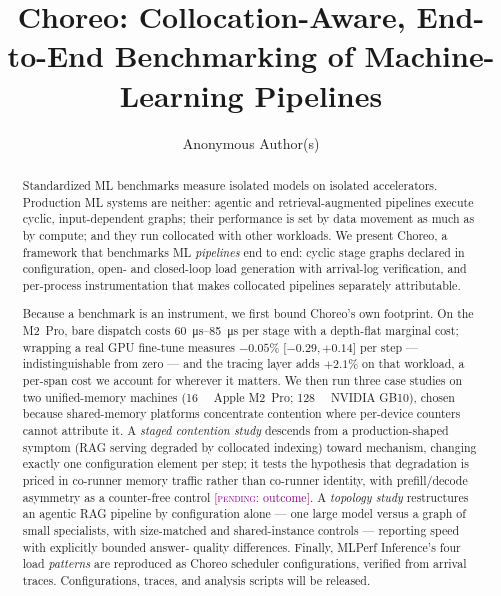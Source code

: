 \documentclass[sigconf,anonymous,review]{acmart}
\newcommand{\sysname}{Choreo}
\newcommand{\pending}[1]{\textcolor{purple}{[\textsc{pending}: #1]}}
\begin{document}
\title{\sysname: Collocation-Aware, End-to-End Benchmarking of
Machine-Learning Pipelines}

\author{Anonymous Author(s)}

\begin{abstract}
Standardized ML benchmarks measure isolated models on isolated accelerators.
Production ML systems are neither: agentic and retrieval-augmented pipelines
execute cyclic, input-dependent graphs; their performance is set by data
movement as much as by compute; and they run collocated with other workloads.
We present \sysname{}, a framework that benchmarks ML \emph{pipelines} end to
end: cyclic stage graphs declared in configuration, open- and closed-loop
load generation with arrival-log verification, and per-process
instrumentation that makes collocated pipelines separately attributable.

Because a benchmark is an instrument, we first bound \sysname{}'s own
footprint. On the M2~Pro, bare dispatch costs
\SIrange{60}{85}{\micro\second} per stage with a depth-flat marginal
cost; wrapping a real GPU fine-tune measures $-0.05\%$ [$-0.29,+0.14$]
per step --- indistinguishable from zero --- and the tracing layer adds
$+2.1\%$ on that workload, a per-span cost we account for wherever it
matters. We then run three case studies on two unified-memory
machines (\SI{16}{\giga\byte} Apple M2~Pro; \SI{128}{\giga\byte} NVIDIA
GB10), chosen because shared-memory platforms concentrate contention where
per-device counters cannot attribute it. A \emph{staged contention study}
descends from a production-shaped symptom (RAG serving degraded by collocated
indexing) toward mechanism, changing exactly one configuration element per
step; it tests the hypothesis that degradation is priced in co-runner memory
traffic rather than co-runner identity, with prefill/decode asymmetry as a
counter-free control \pending{outcome}. A \emph{topology study}
restructures an agentic RAG pipeline by configuration alone --- one large
model versus a graph of small specialists, with size-matched and
shared-instance controls --- reporting speed with explicitly bounded answer-%
quality differences. Finally, MLPerf Inference's four load \emph{patterns}
are reproduced as \sysname{} scheduler configurations, verified from arrival
traces. Configurations, traces, and analysis scripts will be released.
\end{abstract}

\maketitle











\end{document}
